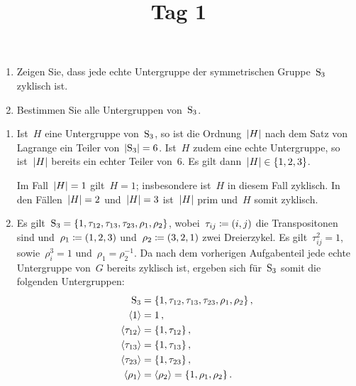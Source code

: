 \documentclass{scrartcl}
\title{\vspace{-1em}Tag 1}
\author{}
\date{}
\begin{document}
\maketitle
\vspace{-7em}


\begin{exercise}
  \begin{enumerate}
    \item
      Zeigen Sie, dass jede echte Untergruppe der symmetrischen Gruppe~$\operatorname{S}_3$ zyklisch ist.
    \item
      Bestimmen Sie alle Untergruppen von~$\operatorname{S}_3$.
  \end{enumerate}
\end{exercise}

\begin{solution}
  \begin{enumerate}
    \item
      Ist~$H$ eine Untergruppe von~$\operatorname{S}_3$, so ist die Ordnung~$\lvert H\rvert$ nach dem Satz von Lagrange ein Teiler von~$\lvert\operatorname{S}_3\rvert = 6$.
      Ist~$H$ zudem eine echte Untergruppe, so ist~$\lvert H\rvert$ bereits ein echter Teiler von~$6$.
      Es gilt dann~$\lvert H\rvert \in \{1, 2, 3\}$.

      Im Fall~$\lvert H\rvert = 1$ gilt~$H = 1$;
      insbesondere ist~$H$ in diesem Fall zyklisch.
      In den Fällen~$\lvert H\rvert = 2$ und~$\lvert H\rvert = 3$ ist~$\lvert H\rvert$ prim und~$H$ somit zyklisch.
    \item
      Es gilt~$\operatorname{S}_3 = \{ 1, \tau_{12}, \tau_{13}, \tau_{23}, \rho_1, \rho_2 \}$, wobei~$\tau_{ij} \coloneqq (i,j)$ die Transpositonen sind und~$\rho_1 \coloneqq (1, 2, 3)$ und~$\rho_2 \coloneqq (3, 2, 1)$ zwei Dreierzykel.
      Es gilt~$\tau_{ij}^2 = 1$, sowie~$\rho_i^3 = 1$ und~$\rho_1 = \rho_2^{-1}$.
      Da nach dem vorherigen Aufgabenteil jede echte Untergruppe von~$G$ bereits zyklisch ist, ergeben sich für~$\operatorname{S}_3$ somit die folgenden Untergruppen:
      \begin{align*}
        \operatorname{S}_3
        &=
        \{ 1, \tau_{12}, \tau_{13}, \tau_{23}, \rho_1, \rho_2 \} \,,
        \\
        \langle1\rangle &= 1 \,,
        \\
        \langle \tau_{12} \rangle &= \{ 1, \tau_{12} \} \,,
        \\
        \langle \tau_{13} \rangle &= \{ 1, \tau_{13} \} \,,
        \\
        \langle \tau_{23} \rangle &= \{ 1, \tau_{23} \} \,,
        \\
        \langle \rho_1 \rangle &= \langle \rho_2 \rangle = \{ 1, \rho_1, \rho_2 \} \,.
      \end{align*}
  \end{enumerate}
\end{solution}
\end{document}
